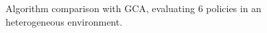 \documentclass[letterpaper,conference,10pt]{IEEEconf}
\begin{document}
\begin{figure}
    \centering
    \scalebox{1.3}{}
    \vspace{-6mm}
    \caption{Algorithm comparison with GCA, evaluating 6 policies in an heterogeneous environment.}
    \vspace{-6mm}
    \label{plots:inhom}
\end{figure}
\end{document}
